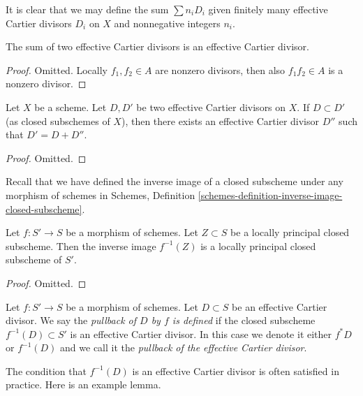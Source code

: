 \noindent
It is clear that we may define the sum $\sum n_iD_i$ given
finitely many effective Cartier divisors $D_i$ on $X$
and nonnegative integers $n_i$.

\begin{lemma}
\label{lemma-sum-effective-Cartier-divisors}
The sum of two effective Cartier divisors is an effective
Cartier divisor.
\end{lemma}

\begin{proof}
Omitted. Locally $f_1, f_2 \in A$ are nonzero divisors, then also
$f_1f_2 \in A$ is a nonzero divisor.
\end{proof}

\begin{lemma}
\label{lemma-difference-effective-Cartier-divisors}
Let $X$ be a scheme.
Let $D, D'$ be two effective Cartier divisors on $X$.
If $D \subset D'$ (as closed subschemes of $X$), then
there exists an effective Cartier divisor $D''$ such
that $D' = D + D''$.
\end{lemma}

\begin{proof}
Omitted.
\end{proof}

\noindent
Recall that we have defined the inverse image of a closed subscheme
under any morphism of schemes in
Schemes, Definition \ref{schemes-definition-inverse-image-closed-subscheme}.

\begin{lemma}
\label{lemma-pullback-locally-principal}
Let $f : S' \to S$ be a morphism of schemes. Let $Z \subset S$
be a locally principal closed subscheme. Then the inverse image
$f^{-1}(Z)$ is a locally principal closed subscheme of $S'$.
\end{lemma}

\begin{proof}
Omitted.
\end{proof}

\begin{definition}
\label{definition-pullback-effective-Cartier-divisor}
Let $f : S' \to S$ be a morphism of schemes. Let $D \subset S$
be an effective Cartier divisor. We say the {\it pullback of
$D$ by $f$ is defined} if the closed subscheme $f^{-1}(D) \subset S'$
is an effective Cartier divisor. In this case we denote it either
$f^*D$ or $f^{-1}(D)$ and we call it the
{\it pullback of the effective Cartier divisor}.
\end{definition}

\noindent
The condition that $f^{-1}(D)$ is an effective Cartier divisor
is often satisfied in practice. Here is an example lemma.

